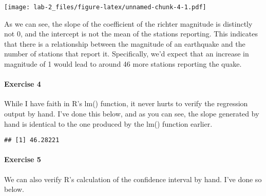 \documentclass[]{article}
\newenvironment{Shaded}{\begin{snugshade}}{\end{snugshade}}
\newcommand{\KeywordTok}[1]{\textcolor[rgb]{0.13,0.29,0.53}{\textbf{#1}}}
\newcommand{\DataTypeTok}[1]{\textcolor[rgb]{0.13,0.29,0.53}{#1}}
\newcommand{\DecValTok}[1]{\textcolor[rgb]{0.00,0.00,0.81}{#1}}
\newcommand{\StringTok}[1]{\textcolor[rgb]{0.31,0.60,0.02}{#1}}
\newcommand{\OperatorTok}[1]{\textcolor[rgb]{0.81,0.36,0.00}{\textbf{#1}}}
\newcommand{\NormalTok}[1]{#1}
\let\oldparagraph\paragraph
\renewcommand{\paragraph}[1]{\oldparagraph{#1}\mbox{}}
\begin{document}
\texttt{[image: lab-2\_files/figure-latex/unnamed-chunk-4-1.pdf]}

As we can see, the slope of the coefficient of the richter magnitude is
distinctly not 0, and the intercept is not the mean of the stations
reporting. This indicates that there is a relationship between the
magnitude of an earthquake and the number of stations that report it.
Specifically, we'd expect that an increase in magnitude of 1 would lead
to around 46 more stations reporting the quake.

\paragraph{Exercise 4}\label{exercise-4}

While I have faith in R's lm() function, it never hurts to verify the
regression output by hand. I've done this below, and as you can see, the
slope generated by hand is identical to the one produced by the lm()
function earlier.

\begin{Shaded}
\end{Shaded}

\begin{verbatim}
## [1] 46.28221
\end{verbatim}

\paragraph{Exercise 5}\label{exercise-5}

We can also verify R's calculation of the confidence interval by hand.
I've done so below.

\begin{Shaded}
\end{Shaded}
\end{document}

